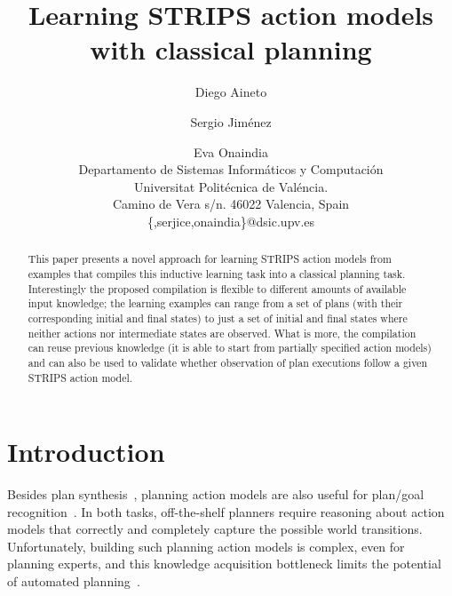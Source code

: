 \documentclass[letterpaper]{article} %
\begin{document}
\title{Learning STRIPS action models with classical planning}

\author{Diego Aineto\and Sergio Jim\'enez\and Eva Onaindia\\
{\small Departamento de Sistemas Inform\'aticos y Computaci\'on}\\
{\small Universitat Polit\'ecnica de Val\'encia.}\\
{\small Camino de Vera s/n. 46022 Valencia, Spain}\\
{\small \{,serjice,onaindia\}@dsic.upv.es}}
 
\maketitle
\begin{abstract}
This paper presents a novel approach for learning STRIPS action models from examples that compiles this inductive learning task into a classical planning task. Interestingly the proposed compilation is flexible to different amounts of available input knowledge; the learning examples can range from a set of plans (with their corresponding initial and final states) to just a set of initial and final states where neither actions nor intermediate states are observed. What is more, the compilation can reuse previous knowledge (it is able to start from partially specified action models) and can also be used to validate whether observation of plan executions follow a given STRIPS action model. 
\end{abstract}


\section{Introduction}
Besides plan synthesis~\cite{ghallab2004automated,geffner:book:2013}, planning action models are also useful for plan/goal recognition~\cite{ramirez2012plan}. In both tasks, off-the-shelf planners require reasoning about action models that correctly and completely capture the possible world transitions. Unfortunately, building such planning action models is complex, even for planning experts, and this knowledge acquisition bottleneck limits the potential of automated planning~\cite{kambhampati:modellite:AAAI2007}.  
\end{document}
